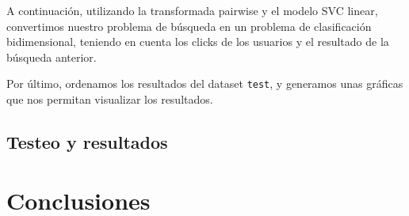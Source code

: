 \documentclass[a4paper,12pt]{article}
\begin{document}
	A continuación, utilizando la transformada pairwise y el modelo SVC linear, convertimos nuestro problema de búsqueda en un problema de clasificación bidimensional, teniendo en cuenta los clicks de los usuarios y el resultado de la búsqueda anterior. 
	
	Por último, ordenamos los resultados del dataset \texttt{test}, y generamos unas gráficas que nos permitan visualizar los resultados.
	
	\subsection{Testeo y resultados}
	
	
	
	\section{Conclusiones}
	

	
	
	
	
\end{document}
